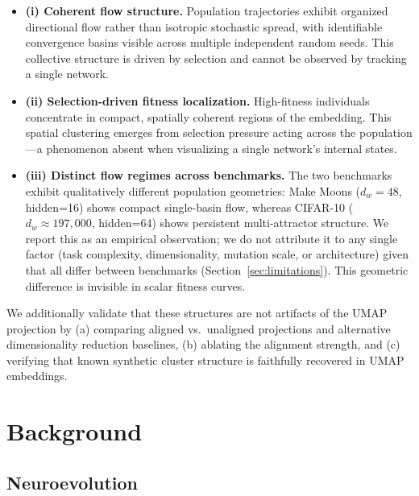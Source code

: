 \documentclass{article}
\begin{document}
\begin{itemize}
  \item \textbf{(i) Coherent flow structure.} Population trajectories
    exhibit organized directional flow rather than isotropic stochastic
    spread, with identifiable convergence basins visible across multiple
    independent random seeds. This collective structure is driven by
    selection and cannot be observed by tracking a single network.

  \item \textbf{(ii) Selection-driven fitness localization.} High-fitness
    individuals concentrate in compact, spatially coherent regions of
    the embedding. This spatial clustering emerges from selection pressure
    acting across the population---a phenomenon absent when visualizing
    a single network's internal states.

  \item \textbf{(iii) Distinct flow regimes across benchmarks.} The two
    benchmarks exhibit qualitatively different population geometries:
    Make Moons ($d_w = 48$, hidden=16) shows compact single-basin flow,
    whereas CIFAR-10 ($d_w \approx 197{,}000$, hidden=64) shows persistent
    multi-attractor structure. We report this as an empirical observation;
    we do not attribute it to any single factor (task complexity,
    dimensionality, mutation scale, or architecture) given that all differ
    between benchmarks (Section~\ref{sec:limitations}). This geometric
    difference is invisible in scalar fitness curves.
\end{itemize}

We additionally validate that these structures are not artifacts of the
UMAP projection by (a) comparing aligned vs.\ unaligned projections and
alternative dimensionality reduction baselines, (b) ablating the
alignment strength, and (c) verifying that known synthetic cluster
structure is faithfully recovered in UMAP embeddings.


\section{Background}

\subsection{Neuroevolution}
\end{document}
